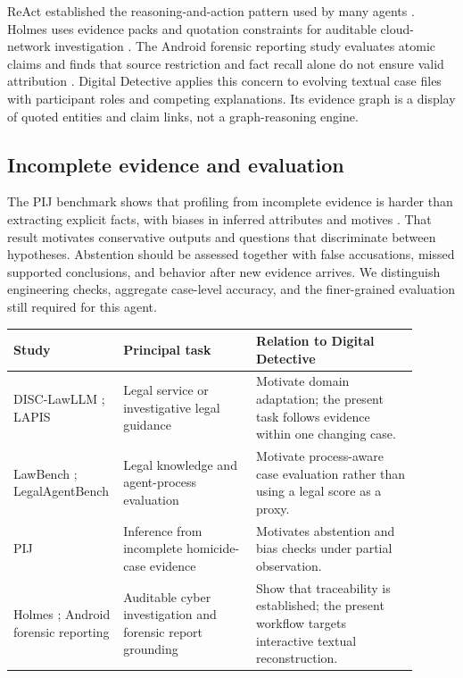 \documentclass[10pt,a4paper]{article}
\begin{document}
ReAct established the reasoning-and-action pattern used by many agents \cite{react}. Holmes uses evidence packs and quotation constraints for auditable cloud-network investigation \cite{holmes}. The Android forensic reporting study evaluates atomic claims and finds that source restriction and fact recall alone do not ensure valid attribution \cite{androidforensics}. Digital Detective applies this concern to evolving textual case files with participant roles and competing explanations. Its evidence graph is a display of quoted entities and claim links, not a graph-reasoning engine.

\subsection{Incomplete evidence and evaluation}
The PIJ benchmark shows that profiling from incomplete evidence is harder than extracting explicit facts, with biases in inferred attributes and motives \cite{beforearrest}. That result motivates conservative outputs and questions that discriminate between hypotheses. Abstention should be assessed together with false accusations, missed supported conclusions, and behavior after new evidence arrives. We distinguish engineering checks, aggregate case-level accuracy, and the finer-grained evaluation still required for this agent.

\begin{center}
\centering\small
{}
\label{tab:prior}
\begin{tabular}{p{0.19\linewidth}p{0.32\linewidth}p{0.39\linewidth}}
\toprule
Study & Principal task & Relation to Digital Detective\\
\midrule
DISC-LawLLM \cite{disc}; LAPIS \cite{lapis} & Legal service or investigative legal guidance & Motivate domain adaptation; the present task follows evidence within one changing case.\\
LawBench \cite{lawbench}; LegalAgentBench \cite{legalagentbench} & Legal knowledge and agent-process evaluation & Motivate process-aware case evaluation rather than using a legal score as a proxy.\\
PIJ \cite{beforearrest} & Inference from incomplete homicide-case evidence & Motivates abstention and bias checks under partial observation.\\
Holmes \cite{holmes}; Android forensic reporting \cite{androidforensics} & Auditable cyber investigation and forensic report grounding & Show that traceability is established; the present workflow targets interactive textual reconstruction.\\
\bottomrule
\end{tabular}
\end{center}
\end{document}
